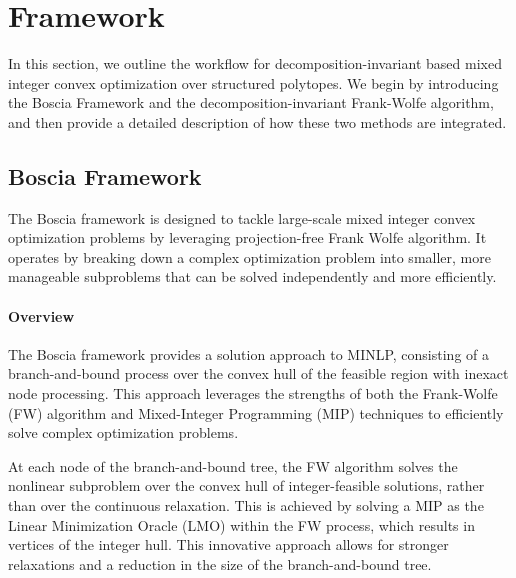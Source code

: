 \chapter{Framework\label{cha:chapter3}}
In this section, we outline the workflow for decomposition-invariant based mixed integer convex optimization over structured polytopes. We begin by introducing the Boscia Framework and the decomposition-invariant Frank-Wolfe algorithm, and then provide a detailed description of how these two methods are integrated.

\section{Boscia Framework\label{sec:boscia}}
The Boscia framework is designed to tackle large-scale mixed integer convex optimization problems by leveraging projection-free Frank Wolfe algorithm. It operates by breaking down a complex optimization problem into smaller, more manageable subproblems that can be solved independently and more efficiently. 

\subsubsection{Overview}
The Boscia framework provides a solution approach to MINLP, consisting of a branch-and-bound process over the convex hull of the feasible region with inexact node processing. This approach leverages the strengths of both the Frank-Wolfe (FW) algorithm and Mixed-Integer Programming (MIP) techniques to efficiently solve complex optimization problems.

At each node of the branch-and-bound tree, the FW algorithm solves the nonlinear subproblem over the convex hull of integer-feasible solutions, rather than over the continuous relaxation. This is achieved by solving a MIP as the Linear Minimization Oracle (LMO) within the FW process, which results in vertices of the integer hull. This innovative approach allows for stronger relaxations and a reduction in the size of the branch-and-bound tree.

